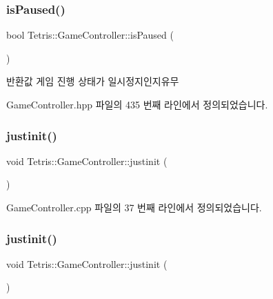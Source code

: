 \subsubsection{\texorpdfstring{is\+Paused()}{isPaused()}\hspace{0.1cm}{\footnotesize\ttfamily [2/2]}}
{\footnotesize\ttfamily bool Tetris\+::\+Game\+Controller\+::is\+Paused (\begin{DoxyParamCaption}{ }\end{DoxyParamCaption})\hspace{0.3cm}{\ttfamily [inline]}}

\begin{DoxyReturn}{반환값}
게임 진행 상태가 일시정지인지유무 
\end{DoxyReturn}


Game\+Controller.\+hpp 파일의 435 번째 라인에서 정의되었습니다.

\mbox{\label{class_tetris_1_1_game_controller_aef406397d4719c9edd49774d0343ce05}} 
\subsubsection{\texorpdfstring{justinit()}{justinit()}\hspace{0.1cm}{\footnotesize\ttfamily [1/2]}}
{\footnotesize\ttfamily void Tetris\+::\+Game\+Controller\+::justinit (\begin{DoxyParamCaption}{ }\end{DoxyParamCaption})}



Game\+Controller.\+cpp 파일의 37 번째 라인에서 정의되었습니다.

\mbox{\label{class_tetris_1_1_game_controller_aef406397d4719c9edd49774d0343ce05}} 
\subsubsection{\texorpdfstring{justinit()}{justinit()}\hspace{0.1cm}{\footnotesize\ttfamily [2/2]}}
{\footnotesize\ttfamily void Tetris\+::\+Game\+Controller\+::justinit (\begin{DoxyParamCaption}{ }\end{DoxyParamCaption})\hspace{0.3cm}{\ttfamily [inline]}}



